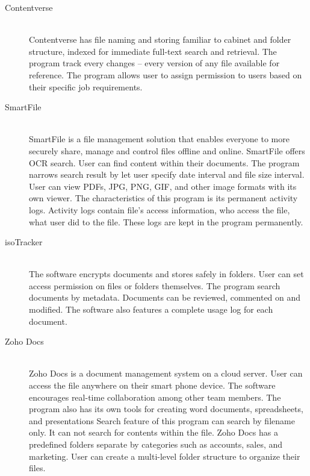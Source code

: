 \begin{description}
\item[Contentverse] \hfill \\
Contentverse has file naming and storing familiar to cabinet and folder structure, indexed for immediate full-text search and retrieval.
The program track every changes -- every version of any file available for reference.
The program allows user to assign permission to users based on their specific job requirements.

\item[SmartFile] \hfill \\
SmartFile is a file management solution that enables everyone to more securely share, manage and control files offline and online.
SmartFile offers \gls{OCR} search.
User can find content within their documents.
The program narrows search result by let user specify date interval and file size interval.
User can view PDFs, JPG, PNG, GIF, and other image formats with its own viewer.
The characteristics of this program is its permanent activity logs.
Activity logs contain file's access information, who access the file, what user did to the file.
These logs are kept in the program permanently.

\item[isoTracker] \hfill \\
The software encrypts documents and stores safely in folders.
User can set access permission on files or folders themselves.
The program search documents by metadata.
Documents can be reviewed, commented on and modified. The software also features a complete usage log for each document.

\item[Zoho Docs] \hfill \\
Zoho Docs is a document management system on a cloud server.
User can access the file anywhere on their smart phone device.
The software encourages real-time collaboration among other team members.
The program also has its own tools for creating word documents, spreadsheets, and presentations
Search feature of this program can search by filename only.
It can not search for contents within the file.
Zoho Docs has a predefined folders separate by categories such as accounts, sales, and marketing.
User can create a multi-level folder structure to organize their files.
\end{description}


